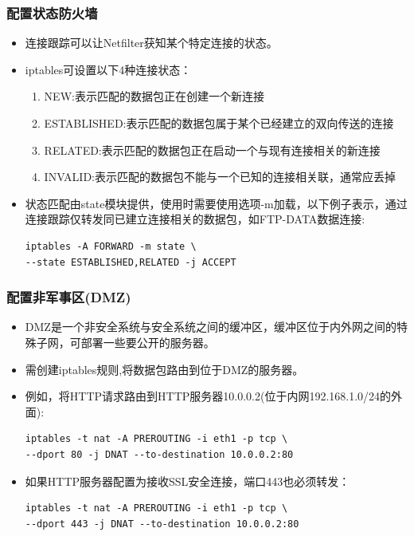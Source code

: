 \documentclass[xcolor=svgnames,presentation]{beamer}
\begin{document}
\begin{frame}[fragile]
\frametitle{配置状态防火墙}
\label{sec-3-11}
\begin{itemize}

\item 连接跟踪可以让Netfilter获知某个特定连接的状态。
\label{sec-3-11-1}%

\item iptables可设置以下4种连接状态：
\label{sec-3-11-2}%
\begin{enumerate}
\item NEW:表示匹配的数据包正在创建一个新连接
\item ESTABLISHED:表示匹配的数据包属于某个已经建立的双向传送的连接
\item RELATED:表示匹配的数据包正在启动一个与现有连接相关的新连接
\item INVALID:表示匹配的数据包不能与一个已知的连接相关联，通常应丢掉
\end{enumerate}

\item 状态匹配由state模块提供，使用时需要使用选项-m加载，以下例子表示，通过连接跟踪仅转发同已建立连接相关的数据包，如FTP-DATA数据连接:\\
\label{sec-3-11-3}%
\begin{verbatim}
iptables -A FORWARD -m state \
--state ESTABLISHED,RELATED -j ACCEPT
\end{verbatim}
\end{itemize} %
\end{frame}
\begin{frame}[fragile]
\frametitle{配置非军事区(DMZ)}
\label{sec-3-12}
\begin{itemize}

\item DMZ是一个非安全系统与安全系统之间的缓冲区，缓冲区位于内外网之间的特殊子网，可部署一些要公开的服务器。
\label{sec-3-12-1}%

\item 需创建iptables规则,将数据包路由到位于DMZ的服务器。
\label{sec-3-12-2}%

\item 例如，将HTTP请求路由到HTTP服务器10.0.0.2(位于内网192.168.1.0/24的外面):\\
\label{sec-3-12-3}%
\begin{verbatim}
iptables -t nat -A PREROUTING -i eth1 -p tcp \
--dport 80 -j DNAT --to-destination 10.0.0.2:80
\end{verbatim}

\item 如果HTTP服务器配置为接收SSL安全连接，端口443也必须转发：\\
\label{sec-3-12-4}%
\begin{verbatim}
iptables -t nat -A PREROUTING -i eth1 -p tcp \
--dport 443 -j DNAT --to-destination 10.0.0.2:80
\end{verbatim}
\end{itemize} %
\end{frame}
\end{document}
